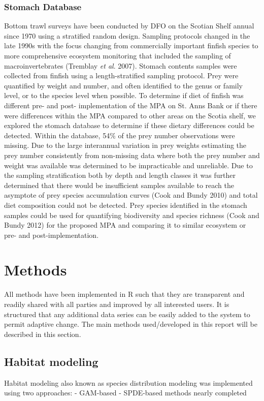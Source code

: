 \documentclass[letterpaper,portrait,11pt]{scrartcl}
\numberwithin{equation}{section}		%
\numberwithin{figure}{section}			%
\numberwithin{table}{section}				%
\begin{document}
\begin{itemize*}
\subsubsection{Stomach Database}
Bottom trawl surveys have been conducted by DFO on the Scotian Shelf annual since 1970 using a stratified random design.  Sampling protocols changed in the late 1990s with the focus changing from commercially important finfish species to more comprehensive ecosystem monitoring that included the sampling of macroinvertebrates (Tremblay \textit{et al}. 2007).  Stomach contents samples were collected from finfish using a length-stratified sampling protocol.  Prey were quantified by weight and number, and often identified to the genus or family level, or to the species level when possible.  To determine if diet of finfish was different pre- and post- implementation of the MPA on St. Anns Bank or if there were differences within the MPA compared to other areas on the Scotia shelf, we explored the stomach database to determine if these dietary differences could be detected. Within the database, 54\% of the prey number observations were missing.  Due to the large interannual variation in prey weights estimating the prey number consistently from non-missing data where both the prey number and weight was available was determined to be impracticable and unreliable.  Due to the sampling stratification both by depth and length classes it was further determined that there would be insufficient samples available to reach the asymptote of prey species accumulation curves (Cook and Bundy 2010) and total diet composition could not be detected.  Prey species identified in the stomach samples could be used for quantifying biodiversity and species richness (Cook and Bundy 2012) for the proposed MPA and comparing it to similar ecosystem or pre- and post-implementation.




\section{Methods}
All methods have been implemented in R such that they are transparent and readily shared with all parties and improved by all interested users. It is structured that any additional data series can be easily added to the system to permit adaptive change.
The main methods used/developed in this report will be described in this section.

\subsection{Habitat modeling}
Habitat  modeling also known as species distribution modeling was implemented using two approaches: 
- GAM-based 
- SPDE-based methods nearly completed



\end{itemize*}
\end{document}
